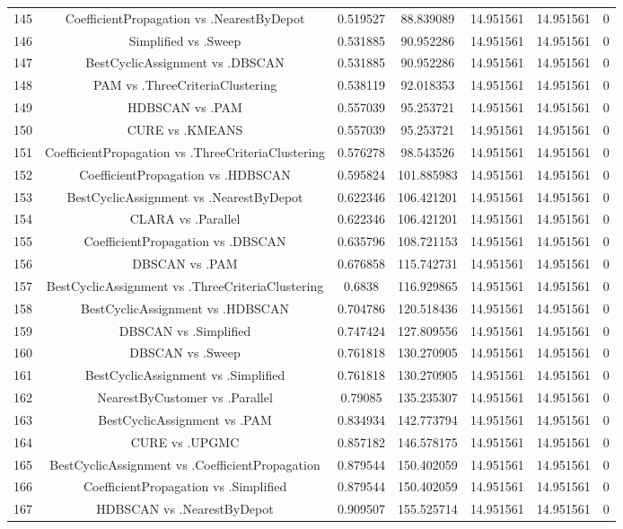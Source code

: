 \documentclass[a4paper,10pt]{article}
\begin{document}
\begin{landscape}
\begin{table}[!htp]
\begin{tabular}{ccccccc}
145&CoefficientPropagation vs .NearestByDepot&0.519527&88.839089&14.951561&14.951561&0\\
146&Simplified vs .Sweep&0.531885&90.952286&14.951561&14.951561&0\\
147&BestCyclicAssignment vs .DBSCAN&0.531885&90.952286&14.951561&14.951561&0\\
148&PAM vs .ThreeCriteriaClustering&0.538119&92.018353&14.951561&14.951561&0\\
149&HDBSCAN vs .PAM&0.557039&95.253721&14.951561&14.951561&0\\
150&CURE vs .KMEANS&0.557039&95.253721&14.951561&14.951561&0\\
151&CoefficientPropagation vs .ThreeCriteriaClustering&0.576278&98.543526&14.951561&14.951561&0\\
152&CoefficientPropagation vs .HDBSCAN&0.595824&101.885983&14.951561&14.951561&0\\
153&BestCyclicAssignment vs .NearestByDepot&0.622346&106.421201&14.951561&14.951561&0\\
154&CLARA vs .Parallel&0.622346&106.421201&14.951561&14.951561&0\\
155&CoefficientPropagation vs .DBSCAN&0.635796&108.721153&14.951561&14.951561&0\\
156&DBSCAN vs .PAM&0.676858&115.742731&14.951561&14.951561&0\\
157&BestCyclicAssignment vs .ThreeCriteriaClustering&0.6838&116.929865&14.951561&14.951561&0\\
158&BestCyclicAssignment vs .HDBSCAN&0.704786&120.518436&14.951561&14.951561&0\\
159&DBSCAN vs .Simplified&0.747424&127.809556&14.951561&14.951561&0\\
160&DBSCAN vs .Sweep&0.761818&130.270905&14.951561&14.951561&0\\
161&BestCyclicAssignment vs .Simplified&0.761818&130.270905&14.951561&14.951561&0\\
162&NearestByCustomer vs .Parallel&0.79085&135.235307&14.951561&14.951561&0\\
163&BestCyclicAssignment vs .PAM&0.834934&142.773794&14.951561&14.951561&0\\
164&CURE vs .UPGMC&0.857182&146.578175&14.951561&14.951561&0\\
165&BestCyclicAssignment vs .CoefficientPropagation&0.879544&150.402059&14.951561&14.951561&0\\
166&CoefficientPropagation vs .Simplified&0.879544&150.402059&14.951561&14.951561&0\\
167&HDBSCAN vs .NearestByDepot&0.909507&155.525714&14.951561&14.951561&0\\

\end{tabular}
\end{table}
\end{landscape}
\end{document}
